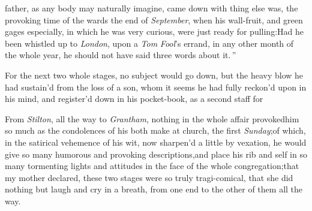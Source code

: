 \documentclass{article}
\begin{document}
 father, as any body may naturally imagine, came down with\break
{} 
 thing else was, the provoking time of the
 wards the end of
\textit{September}, when his wall-fruit, and green gages especially, in which he was
very curious, were just ready for pulling:\tsh \lqq Had he been\break
\lqq whistled up to \textit{London}, upon a \textit{Tom}\break
\lqq \textit{Fool}’s errand, in any other month of\break
\lqq the whole year, he should not have\break
\lqq said three words about it.\,”

For the next two whole stages, no\break
subject would go down, but the heavy blow he
had sustain’d from the loss of a son, whom it seems he had fully
reckon’d upon in his mind, and register’d down in his pocket-book,
as a second staff for\break
{}

From \textit{Stilton}, all the way to \textit{Grantham}, nothing in
the whole affair provoked\break him so much as the condolences of his
both make at church,
the first \textit{Sunday};\break\tsk of which, in the satirical
vehemence of his wit, now sharpen’d a little by vexation, he
would give so many humorous and provoking descriptions,\tsk and
place his rib and self in so many tormenting lights and attitudes
in the face of the whole congregation;\tsk that my mother
declared, these two stages were so truly tragi-comical, that she
did nothing but laugh and cry in a breath, from one end to the
other of them all the way.
\end{document}
